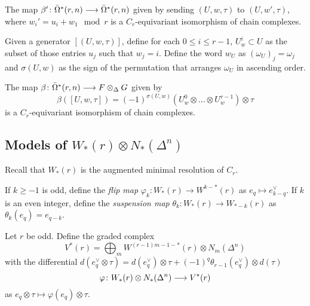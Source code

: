 \begin{lemma}
	The map $\beta'\colon \bar{\Omega}^*(r,n)\longrightarrow \bar{\Omega}^*(r,n)$ given by sending $(U,w,\tau)$ to $(U,w',\tau)$, where $w_i' = u_i+w_1\mod r$ is a $C_r$-equivariant isomorphism of chain complexes.
\end{lemma}

Given a generator $[(U,w,\tau)]$, define for each $0\leq i\leq r-1$, $U_w^i \subset U$ as the subset of those entries $u_j$ such that $w_j=i$. Define the word $w_U$ as $(\omega_U)_j = \omega_j$ and $\sigma(U,w)$ as the sign of the permutation that arranges $\omega_U$ in ascending order. 

\begin{lemma}
	The map $\beta\colon \bar{\Omega}^*(r,n)\longrightarrow F\otimes_\Delta G$ given by
	\[\beta([U,w,\tau]) = (-1)^{\sigma(U,w)}(U_w^0\otimes\ldots\otimes U_w^{r-1})\otimes \tau\]
	is a $C_r$-equivariant isomorphism of chain complexes.
\end{lemma}

\subsection{Models of $W_*(r)\otimes N_*(\Delta^n)$}

Recall that $W_*(r)$ is the augmented minimal resolution of $C_r$.

\begin{definition}
	If $k\geq -1$ is odd, define the \emph{flip map} $\varphi_k\colon W_*(r)\to W^{k-*}(r)$ as $e_q\mapsto e^{\vee}_{k-q}$. If $k$ is an even integer, define the \emph{suspension map} $\theta_k\colon W_*(r)\to W_{*-k}(r)$ as $\theta_k(e_q) = e_{q-k}$.
\end{definition}

Let $r$ be odd. Define the graded complex
\[V^{*}(r) = \bigoplus_{m}W^{(r-1)m-1-*}(r)\otimes N_m(\Delta^n)\]
with the differential $d(e^\vee_q\otimes \tau) = d(e^\vee_q)\otimes \tau + (-1)^q \theta_{r-1}(e^\vee_q)\otimes d(\tau)$%
\[\varphi\colon W_*(r)\otimes N_*(\Delta^n)\longrightarrow V^{*}(r)\]
as $e_{q}\otimes \tau\mapsto \varphi(e_q)\otimes \tau$.

